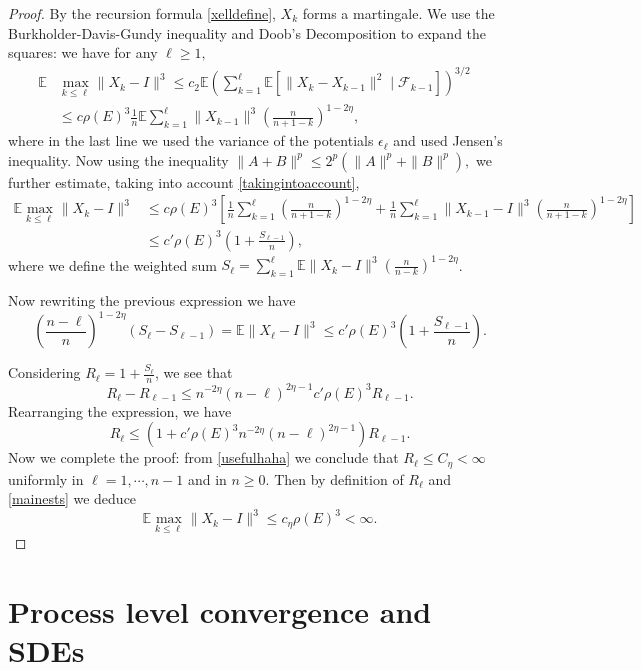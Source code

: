 \documentclass[12pt, reqno]{amsart}
\theoremstyle{definition}
\theoremstyle{remark}
\numberwithin{equation}{section}
\begin{document}
\begin{proof}
By the recursion formula \eqref{xelldefine}, $X_k$ forms a martingale. We use the Burkholder-Davis-Gundy inequality and Doob’s Decomposition to expand the squares:
we have for any $\ell\geq 1,$
$$\begin{aligned}\mathbb{E}&\max_{k\leq\ell}\|X_k-I\|^3\leq c_2\mathbb{E}(\sum_{k=1}^\ell \mathbb{E}[\|X_k-X_{k-1}\|^2\mid\mathcal{F}_{k-1}])^{3/2}
&\\&\leq c\rho(E)^3\frac{1}{n}\mathbb{E}\sum_{k=1}^\ell \|X_{k-1}\|^3(\frac{n}{n+1-
k})^{1-2\eta},\end{aligned}$$ where in the last line we used the variance of the potentials $\epsilon_\ell$ and used Jensen's inequality.
Now using the inequality  $\|A+B\|^p\leq 2^p(\|A\|^p+\|B\|^p),$
we further estimate, taking into account \eqref{takingintoaccount},
\begin{equation}\label{mainests}\begin{aligned}
\mathbb{E}\max_{k\leq\ell}\|X_k-I\|^3&\leq c\rho(E)^3\left[\frac{1}{n}\sum_{k=1}^\ell (\frac{n}{n+1-
k})^{1-2\eta} +\frac{1}{n}\sum_{k=1}^\ell \|X_{k-1}-I\|^3 (\frac{n}{n+1-
k})^{1-2\eta}\right]\\
&\leq c'\rho(E)^3(1+\frac{S_{\ell-1}}{n}),
\end{aligned}\end{equation}
where we define the weighted sum $S_{\ell}=\sum_{k=1}^\ell \mathbb{E}\|X_k-I\|^3(\frac{n}{n-k})^{1-2\eta}$.

Now rewriting the previous expression we have $$(\frac{n-\ell}{n})^{1-2\eta}(S_\ell-S_{\ell-1})=\mathbb{E}\|X_\ell-I\|^3\leq c'\rho(E)^3(1+\frac{S_{\ell-1}}{n}).$$

Considering $R_\ell=1+\frac{S_\ell}{n}$, we see that 
$$R_\ell-  R_{\ell-1}\leq n^{-2\eta} (n-\ell)^{2\eta-1}c'\rho(E)^3R_{\ell-1}.$$ Rearranging the expression, we have 
$$
R_\ell\leq (1+c'\rho(E)^3n^{-2\eta}(n-\ell)^{2\eta-1})R_{\ell-1}.
$$
Now we complete the proof: from \eqref{usefulhaha} we conclude that $R_\ell\leq C_\eta<\infty$ uniformly in $\ell=1,\cdots,n-1$ and in $n\geq 0$. Then by definition of $R_\ell$ and \eqref{mainests} we deduce 
$$\mathbb{E}\max_{k\leq\ell}\|X_k-I\|^3\leq c_\eta\rho(E)^3<\infty.$$
    
\end{proof}




\section{Process level convergence and SDEs}\label{section4}
\end{document}
